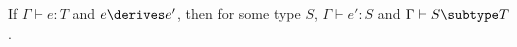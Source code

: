 % 
% 
% 
% 
% 


\begin{theorem} 
\label{preservation}
If $\Gamma \vdash e: T$ and $e \derives e'$, then for some type $S$,
$\Gamma \vdash e': S$ and $\Gamma \vdash S \subtype T$.
\end{theorem}

